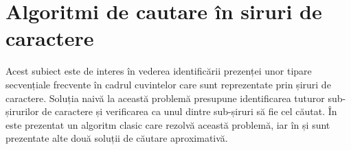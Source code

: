 \section{Algoritmi de cautare în siruri de caractere}

Acest subiect este de interes în vederea identificării prezenței unor tipare secvențiale frecvente în cadrul cuvintelor care sunt reprezentate prin șiruri de caractere. Soluția naivă la această problemă presupune identificarea tuturor sub-șirurilor de caractere și verificarea ca unul dintre sub-șiruri să fie cel căutat. În \cite{bib:knuth1977fast} este prezentat un algoritm clasic care rezolvă această problemă, iar în  \cite{bib:baeza1992new} și \cite{bib:baeza1996faster} sunt prezentate alte două soluții de căutare aproximativă.
